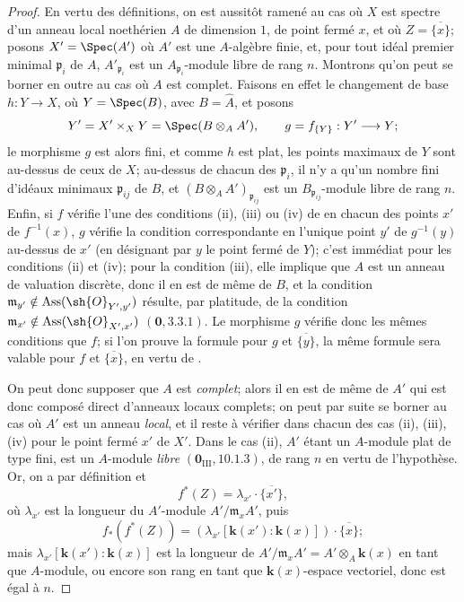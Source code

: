 \begin{proof}
En vertu des définitions, on est aussitôt ramené au cas où $X$ est spectre d'un anneau local noethérien $A$ de dimension $1$, de point fermé $x$, et où $Z=\overline{\{x\}}$;
posons $X'=\Spec(A')$ où $A'$ est une $A$-algèbre finie, et, pour tout idéal premier minimal $\mathfrak{p}_i$ de $A$, $A'_{\mathfrak{p}_i}$ est un $A_{\mathfrak{p}_i}$-module libre de rang $n$.
Montrons qu'on peut se borner en outre au cas où $A$ est complet.
Faisons en effet le changement de base $h:Y\to X$, où $Y=\Spec(B)$, avec $B=\widehat{A}$, et posons
\[
  Y'=X'\times_XY=\Spec(B\otimes_AA'),\qquad g=f_{\{Y\}}:Y'\to Y;
\]
le morphisme $g$ est alors fini, et comme $h$ est plat, les points maximaux de $Y$ sont au-dessus de ceux de $X$;
au-dessus de chacun des $\mathfrak{p}_i$, il n'y a qu'un nombre fini d'idéaux minimaux $\mathfrak{p}_{ij}$ de $B$, et $(B\otimes_AA')_{\mathfrak{p}_{ij}}$ est un $B_{\mathfrak{p}_{ij}}$-module libre de rang $n$.
Enfin, si $f$ vérifie l'une des conditions (ii), (iii) ou (iv) de  en chacun des points $x'$ de $f^{-1}(x)$, $g$ vérifie la condition correspondante en l'unique point $y'$ de $g^{-1}(y)$ au-dessus de $x'$ (en désignant par $y$ le point fermé de $Y$);
c'est immédiat pour les conditions (ii) et (iv);
pour la condition (iii), elle implique que $A$ est un anneau de valuation discrète, donc il en est de même de $B$, et la condition
$\mathfrak{m}_{y'}\notin\operatorname{Ass}(\sh{O}_{Y',y'})$ résulte, par platitude, de la condition $\mathfrak{m}_{x'}\notin\operatorname{Ass}(\sh{O}_{X',x'})$ $(\mathbf{0},3.3.1)$.
Le morphisme $g$ vérifie donc les mêmes conditions que $f$;
si l'on prouve la formule  pour $g$ et $\overline{\{y\}}$, la même formule sera valable pour $f$ et $\overline{\{x\}}$, en vertu de .

On peut donc supposer que $A$ est \emph{complet};
alors il en est de même de $A'$ qui est donc composé direct d'anneaux locaux complets;
on peut par suite se borner au cas où $A'$ est un anneau \emph{local}, et il reste à vérifier  dans chacun des cas (ii), (iii), (iv) pour le point fermé $x'$ de $X'$.
Dans le cas (ii), $A'$ étant un $A$-module plat de type fini, est un $A$-module \emph{libre} $(\mathbf{0}_{\mathrm{III}},10.1.3)$, de rang $n$ en vertu de l'hypothèse.
Or, on a par définition  et 
\[
  f^*(Z)=\lambda_{x'}\cdot\overline{\{x'\}},
\]
où $\lambda_{x'}$ est la longueur du $A'$-module $A'/\mathfrak{m}_xA'$, puis
\[
  f_*(f^*(Z))=(\lambda_{x'}[\boldsymbol{k}(x'): \boldsymbol{k}(x)])\cdot\overline{\{x\}};
\]
mais $\lambda_{x'}[\boldsymbol{k}(x'): \boldsymbol{k}(x)]$ est la longueur de $A'/\mathfrak{m}_xA'=A'\otimes_A\boldsymbol{k}(x)$ en tant que $A$-module, ou encore son rang en tant que $\boldsymbol{k}(x)$-espace vectoriel, donc est égal à $n$.


\end{proof}
